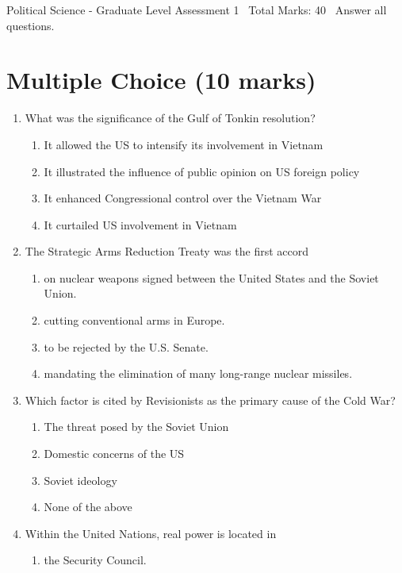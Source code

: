 \documentclass[12pt]{article}
\begin{document}
\begin{center}
Political Science - Graduate Level Assessment 1 \
Total Marks: 40 \
Answer all questions.
\end{center}

\section*{Multiple Choice (10 marks)}
\begin{enumerate}[label=\arabic*.]
\item What was the significance of the Gulf of Tonkin resolution?
\begin{enumerate}[label=(\alph*)]
    \item It allowed the US to intensify its involvement in Vietnam
    \item It illustrated the influence of public opinion on US foreign policy
    \item It enhanced Congressional control over the Vietnam War
    \item It curtailed US involvement in Vietnam
\end{enumerate}
\item The Strategic Arms Reduction Treaty was the first accord
\begin{enumerate}[label=(\alph*)]
    \item on nuclear weapons signed between the United States and the Soviet Union.
    \item cutting conventional arms in Europe.
    \item to be rejected by the U.S. Senate.
    \item mandating the elimination of many long-range nuclear missiles.
\end{enumerate}
\item Which factor is cited by Revisionists as the primary cause of the Cold War?
\begin{enumerate}[label=(\alph*)]
    \item The threat posed by the Soviet Union
    \item Domestic concerns of the US
    \item Soviet ideology
    \item None of the above
\end{enumerate}
\item Within the United Nations, real power is located in
\begin{enumerate}[label=(\alph*)]
    \item the Security Council.

\end{enumerate}
\end{enumerate}
\end{document}
